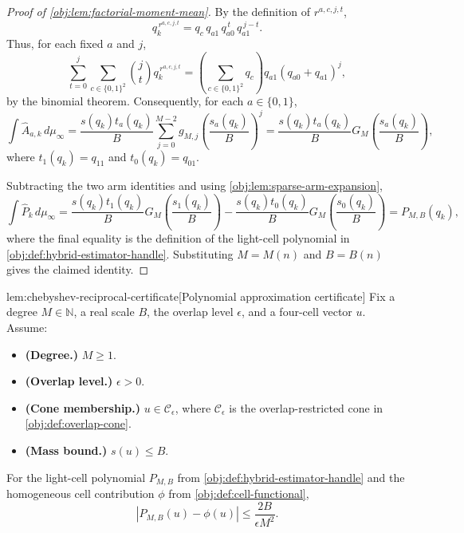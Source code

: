 \documentclass[11pt]{article}
\begin{document}
\begin{proof}[Proof of \cref{obj:lem:factorial-moment-mean}]
By the definition of \(r^{a,c,j,t}\),
\[
q_k^{\,r^{a,c,j,t}}
=
q_c\,q_{a1}\,q_{a0}^{\,t}\,q_{a1}^{\,j-t}.
\]
Thus, for each fixed \(a\) and \(j\),
\[
\sum_{t=0}^{j}\sum_{c\in\{0,1\}^2}
\binom jt q_k^{\,r^{a,c,j,t}}
=
\left(\sum_{c\in\{0,1\}^2}q_c\right)
q_{a1}
(q_{a0}+q_{a1})^j,
\]
by the binomial theorem.
Consequently, for each \(a\in\{0,1\}\),
\[
\int \widehat A_{a,k}\,d\mu_\infty
=
\frac{s(q_k)t_a(q_k)}{B}
\sum_{j=0}^{M-2}
g_{M,j}
\left(\frac{s_a(q_k)}{B}\right)^j
=
\frac{s(q_k)t_a(q_k)}{B}
G_M\!\left(\frac{s_a(q_k)}{B}\right),
\]
where \(t_1(q_k)=q_{11}\) and \(t_0(q_k)=q_{01}\).

Subtracting the two arm identities and using \cref{obj:lem:sparse-arm-expansion},
\[
\int \widehat P_k\,d\mu_\infty
=
\frac{s(q_k)t_1(q_k)}{B}
G_M\!\left(\frac{s_1(q_k)}{B}\right)
-
\frac{s(q_k)t_0(q_k)}{B}
G_M\!\left(\frac{s_0(q_k)}{B}\right)
=
P_{M,B}(q_k),
\]
where the final equality is the definition of the light-cell polynomial in \cref{obj:def:hybrid-estimator-handle}.  Substituting \(M=M(n)\) and \(B=B(n)\) gives the claimed identity.
\end{proof}

\begin{lemmav}{lem:chebyshev-reciprocal-certificate}[Polynomial approximation certificate]
Fix a degree \(M\in\mathbb N\), a real scale \(B\), the overlap level \(\epsilon\), and a four-cell vector \(u\). Assume:
\begin{itemize}
\item \textbf{(Degree.)} \(M\ge 1\).
\item \textbf{(Overlap level.)} \(\epsilon>0\).
\item \textbf{(Cone membership.)} \(u\in\mathcal C_\epsilon\), where \(\mathcal C_\epsilon\) is the overlap-restricted cone in \cref{obj:def:overlap-cone}.
\item \textbf{(Mass bound.)} \(s(u)\le B\).
\end{itemize}
For the light-cell polynomial \(P_{M,B}\) from \cref{obj:def:hybrid-estimator-handle} and the homogeneous cell contribution \(\phi\) from \cref{obj:def:cell-functional},
\[
\left|P_{M,B}(u)-\phi(u)\right|\le \frac{2B}{\epsilon M^2}.
\]
\end{lemmav}
\end{document}
